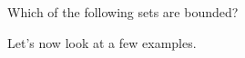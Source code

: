 \documentclass{ximera}
\begin{document}
\begin{question}
Which of the following sets are bounded?

\begin{selectAll}
\end{selectAll}
\end{question}

Let's now look at a few examples.
\end{document}
